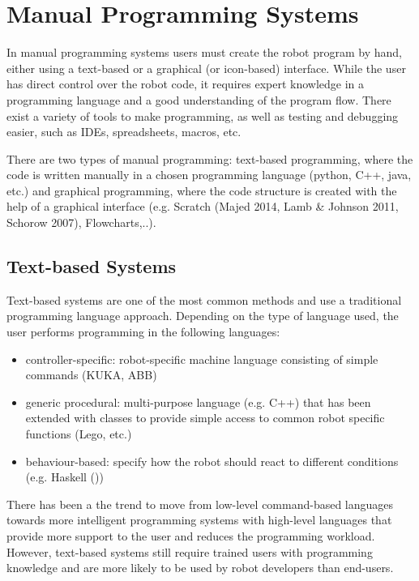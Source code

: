 \section{Manual Programming Systems}\label{subsec:Manual Programming Systems}
In manual programming systems users must create the robot program by hand, either using a text-based or a graphical (or icon-based) interface.
While the user has direct control over the robot code, it requires expert knowledge in a programming language and a good understanding of the program flow.
There exist a variety of tools to make programming, as well as testing and debugging easier, such as IDEs, spreadsheets, macros, etc.

There are two types of manual programming: text-based programming, where the code is written manually in a chosen programming language (python, C++, java, etc.) and graphical programming, where the code structure is created with the help of a graphical interface (e.g. Scratch (Majed 2014, Lamb \& Johnson 2011, Schorow 2007), Flowcharts,..). 

\subsection{Text-based Systems}\label{sssec:Text-based Systems}
Text-based systems are one of the most common methods and use a traditional programming language approach. 
Depending on the type of language used, the user performs programming in the following languages:
\begin{itemize}
	\item controller-specific: robot-specific machine language consisting of simple commands ({KUKA, ABB})
	\item generic procedural: multi-purpose language (e.g. C++) that has been extended with classes to provide simple access to common robot specific functions ({Lego, etc.})
	\item behaviour-based: specify how the robot should react to different conditions (e.g. Haskell (\cite{bibid}))
\end{itemize}
There has been a the trend to move from low-level command-based languages towards more intelligent programming systems with high-level languages that provide more support to the user and  reduces the programming workload.
However, text-based systems still require trained users with programming knowledge and are more likely to be used by robot developers than end-users.


